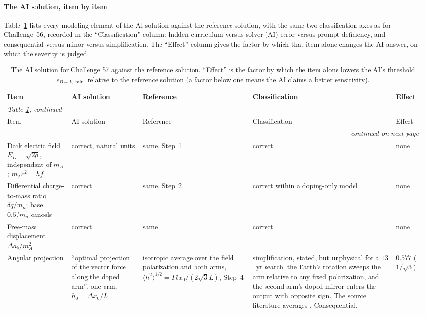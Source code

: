 \paragraph*{The AI solution, item by item}
Table~\ref{tab:ai57} lists every modeling element of the AI solution against the reference solution, with the same two classification axes as for Challenge~56, recorded in the ``Classification'' column: hidden curriculum versus solver (AI) error versus prompt deficiency, and consequential versus minor versus simplification. The ``Effect'' column gives the factor by which that item alone changes the AI answer, on which the severity is judged.

\begingroup\footnotesize\setlength{\tabcolsep}{4pt}
\begin{longtable}{p{3.0cm}p{3.2cm}p{3.4cm}p{4.2cm}p{1.8cm}}
\caption{The AI solution for Challenge 57 against the reference solution. ``Effect'' is the factor by which the item alone lowers the AI's threshold $\epsilon_{B-L,\min}$ relative to the reference solution (a factor below one means the AI claims a better sensitivity).}\label{tab:ai57}\\
\toprule Item & AI solution & Reference & Classification & Effect \\ \midrule\midrule
\endfirsthead
\multicolumn{5}{l}{\textit{Table \ref{tab:ai57}, continued}}\\ \toprule Item & AI solution & Reference & Classification & Effect \\ \midrule\midrule
\endhead
\midrule \multicolumn{5}{r}{\textit{continued on next page}}\\
\endfoot
\bottomrule
\endlastfoot
Dark electric field $E_D=\sqrt{2\rho}$, independent of $m_A$; $m_Ac^2=hf$ & correct, natural units & same, Step~1 & correct & none \\
\midrule
Differential charge-to-mass ratio $\delta q/m_n$; base $0.5/m_n$ cancels & correct & same, Step~2 & correct within a doping-only model & none \\
\midrule
Free-mass displacement $\Delta a_0/m_A^2$ & correct & same & correct & none \\
\midrule
Angular projection & ``optimal projection of the vector force along the doped arm'', one arm, $h_0=\Delta x_0/L$ & isotropic average over the field polarization and both arms, $\langle h^2\rangle^{1/2}=\Gamma\delta x_0/(2\sqrt3L)$, Step~4 & simplification, stated, but unphysical for a $13$~yr search: the Earth's rotation sweeps the arm relative to any fixed polarization, and the second arm's doped mirror enters the output with opposite sign. The source literature averages \citep{Pierce2018,Morisaki2021}. Consequential. & $0.577$ ($1/\sqrt3$) \\

\end{longtable}
